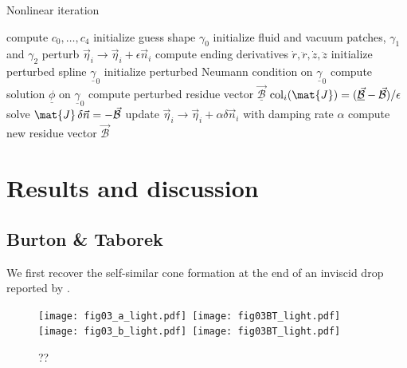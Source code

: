 \documentclass{jfm}
\begin{document}
\begin{algorithm}
  \caption{Nonlinear iteration \label{alg:taylorConeNewton}}
  \begin{algorithmic}[1]
     
    \State compute $c_0,\dots , c_4$ 
    \State initialize guess shape $\gamma_0$
    \State initialize fluid and vacuum patches, $\gamma_1$ and $\gamma_2$
     
     
    \State perturb $\vec{\eta}_i \to \vec{\eta}_i+\epsilon \vec{n}_i$
    \State compute ending derivatives $\dot{r},\ddot{r},\dot{z},\ddot{z}$
    \State initialize perturbed spline $\underline{\gamma}_0$    
     \State initialize perturbed Neumann condition on $\underline{\gamma}_0$    
    \State compute solution $\underline{\phi}$ on $\underline{\gamma}_0$    
     \State compute perturbed residue vector $\underline{\vec{\mathcal{B}}}$ 
     \State $\mathrm{col}_i(\mat{J}) = (\underline{\vec{\mathcal{B}}}-\vec{\mathcal{B}})/\epsilon$
    \EndFor
    \State solve $\mat{J}\, \delta\vec{n}=-\vec{\mathcal{B}}$ 
    \State update $\vec{\eta}_i \to \vec{\eta}_i+\alpha \delta\vec{n}_i$ with damping rate $\alpha$
    \State compute new residue vector $\vec{\mathcal{B}}$
    \EndWhile        
    \EndFunction
  \end{algorithmic}
\end{algorithm}


\section{Results and discussion}
\subsection{Burton \& Taborek}
We first recover the self-similar cone formation at the end of an inviscid drop reported by
\cite{Burton11}.
\begin{figure}  
  \texttt{[image: fig03\_a\_light.pdf]}\,
  \texttt{[image: fig03BT\_light.pdf]}\\
  \texttt{[image: fig03\_b\_light.pdf]}\,
  \texttt{[image: fig03BT\_light.pdf]}
  \caption{\cite{Burton11}
??\label{fig:??}
}
\end{figure}















\end{document}
